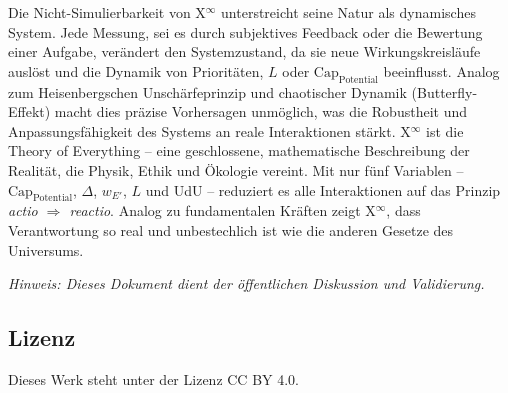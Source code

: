 \documentclass[12pt]{scrartcl}
\begin{document}
Die Nicht-Simulierbarkeit von X$^\infty$ unterstreicht seine Natur als dynamisches System. Jede Messung, sei es durch subjektives Feedback oder die Bewertung einer Aufgabe, verändert den Systemzustand, da sie neue Wirkungskreisläufe auslöst und die Dynamik von Prioritäten, $L$ oder $\text{Cap}_{\text{Potential}}$ beeinflusst. Analog zum Heisenbergschen Unschärfeprinzip und chaotischer Dynamik (Butterfly-Effekt) macht dies präzise Vorhersagen unmöglich, was die Robustheit und Anpassungsfähigkeit des Systems an reale Interaktionen stärkt. X$^\infty$ ist die Theory of Everything – eine geschlossene, mathematische Beschreibung der Realität, die Physik, Ethik und Ökologie vereint. Mit nur fünf Variablen – $\text{Cap}_{\text{Potential}}$, $\Delta$, $w_{E'}$, $L$ und UdU – reduziert es alle Interaktionen auf das Prinzip \emph{actio $\Rightarrow$ reactio}. Analog zu fundamentalen Kräften zeigt X$^\infty$, dass Verantwortung so real und unbestechlich ist wie die anderen Gesetze des Universums.

\textit{Hinweis: Dieses Dokument dient der öffentlichen Diskussion und Validierung.}

\subsection{Lizenz}
Dieses Werk steht unter der Lizenz CC BY 4.0.
\end{document}

